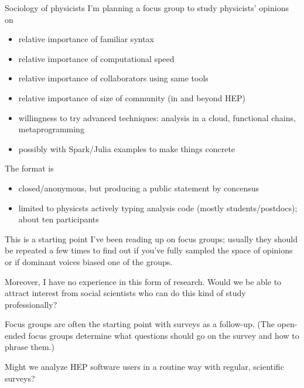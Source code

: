 \documentclass{beamer}
\begin{document}
\begin{frame}{Sociology of physicists}
\vspace{0.35 cm}
I'm planning a focus group to study physicists' opinions on
\begin{itemize}
\item relative importance of familiar syntax
\item relative importance of computational speed
\item relative importance of collaborators using same tools
\item relative importance of size of community (in and beyond HEP)
\item willingness to try advanced techniques: analysis in a cloud, functional chains, metaprogramming
\item possibly with Spark/Julia examples to make things concrete
\end{itemize}

\vspace{0.25 cm}
The format is
\begin{itemize}
\item closed/anonymous, but producing a public statement by concensus
\item limited to physicsts actively typing analysis code (mostly students/postdocs); about ten participants
\end{itemize}
\end{frame}

\begin{frame}{This is a starting point}
I've been reading up on focus groups; usually they should be repeated a few times to find out if you've fully sampled the space of opinions or if dominant voices biased one of the groups.

\vspace{0.35 cm}
Moreover, I have no experience in this form of research. Would we be able to attract interest from social scientists who can do this kind of study professionally?

\vspace{0.35 cm}
Focus groups are often the starting point with surveys as a follow-up. (The open-ended focus groups determine what questions should go on the survey and how to phrase them.)

\vspace{0.35 cm}
Might we analyze HEP software users in a routine way with regular, scientific surveys?
\end{frame}
\end{document}
